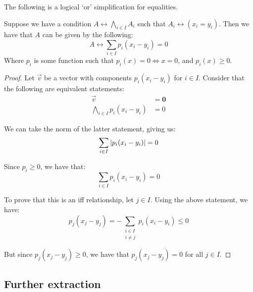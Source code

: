 \begin{theorem}
    The following is a logical `or' simplification for equalities.

    Suppose we have a condition $A\leftrightarrow \displaystyle\bigwedge_{i\in I}{A_i}$ such that $A_i\leftrightarrow(x_i=y_i)$. Then we have that $A$ can be given by the following:
    $$
        A\leftrightarrow\sum_{i\in I}{p_i(x_i-y_i)}=0
    $$
    Where $p_i$ is some function such that $p_i(x)=0\iff x=0$, and $p_i(x)\geq 0$.

    \begin{proof}
        Let $\vec{v}$ be a vector with components $p_i(x_i-y_i)$ for $i\in I$. Consider that the following are equivalent statements:
        \begin{align*}
            \vec{v} &= \mathbf{0} \\
            \bigwedge_{i\in I}{p_i(x_i-y_i)} &= 0
        \end{align*}

        We can take the norm of the latter statement, giving us:
        $$
            \sum_{i\in I}{\abs{p_i(x_i-y_i)}}=0
        $$

        Since $p_i\geq 0$, we have that:
        $$
            \sum_{i\in I}{p_i(x_i-y_i)}=0
        $$

        To prove that this is an iff relationship, let $j\in I$. Using the above statement, we have:
        $$
            p_j(x_j-y_j)=-\sum_{\substack{i\in I\\i\neq j}}{p_i(x_i-y_i)}\leq 0
        $$

        But since $p_j(x_j-y_j)\geq 0$, we have that $p_j(x_j-y_j)=0$ for all $j\in I$.
    \end{proof}
\end{theorem}
\subsection{Further extraction}
\newpage